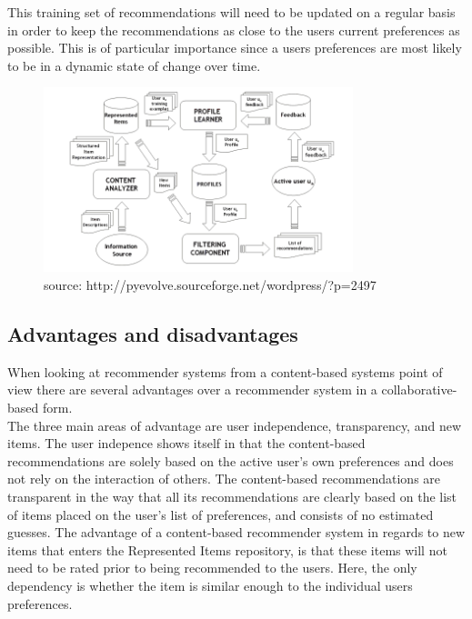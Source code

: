 This training set of recommendations will need to be updated on a regular basis in order to keep the recommendations as close to the users current preferences as possible. This is of particular importance since a users preferences are most likely to be in a dynamic state of change over time.

\begin{figure}[ht!]
\centering
\includegraphics[width=90mm]{Pictures/contentdescription.png}
\caption{source: http://pyevolve.sourceforge.net/wordpress/?p=2497}
\label{contentdescription}
\end{figure}

\subsection{Advantages and disadvantages}
When looking at recommender systems from a content-based systems point of view there are several advantages over a recommender system in a collaborative-based form.\\

The three main areas of advantage are user independence, transparency, and new items.
The user indepence shows itself in that the content-based recommendations are solely based on the active user’s own preferences and does not rely on the interaction of others.
The content-based recommendations are transparent in the way that all its recommendations are clearly based on the list of items placed on the user’s list of preferences, and consists of no estimated guesses. The advantage of a content-based recommender system in regards to new items that enters the Represented Items repository, is that these items will not need to be rated prior to being recommended to the users. Here, the only dependency is whether the item is similar enough to the individual users preferences.\\

